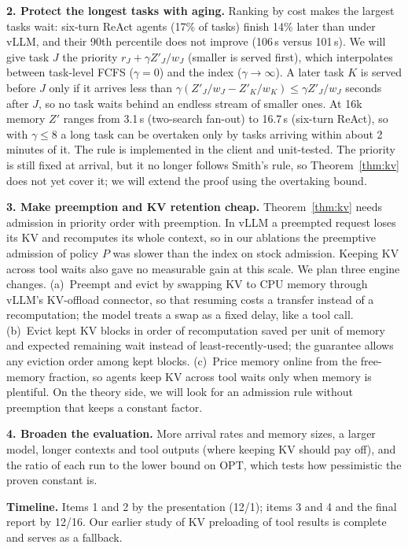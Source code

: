 \documentclass{article}
\newcommand{\OPT}{\mathrm{OPT}}
\begin{document}
\textbf{2. Protect the longest tasks with aging.} Ranking by cost makes the largest tasks wait: six-turn ReAct
agents (17\% of tasks) finish 14\% later than under vLLM, and their 90th percentile does not improve (106\,s versus
101\,s). We will give task $J$ the priority $r_J + \gamma Z'_J/w_J$ (smaller is served first), which interpolates
between task-level FCFS ($\gamma = 0$) and the index ($\gamma \to \infty$). A later task $K$ is served before $J$
only if it arrives less than $\gamma(Z'_J/w_J - Z'_K/w_K) \le \gamma Z'_J/w_J$ seconds after $J$, so no task waits
behind an endless stream of smaller ones. At 16k memory $Z'$ ranges from 3.1\,s (two-search fan-out) to 16.7\,s
(six-turn ReAct), so with $\gamma \le 8$ a long task can be overtaken only by tasks arriving within about 2 minutes
of it. The rule is implemented in the client and unit-tested. The priority is still fixed at arrival, but it no
longer follows Smith's rule, so Theorem~\ref{thm:kv} does not yet cover it; we will extend the proof using the
overtaking bound.

\textbf{3. Make preemption and KV retention cheap.} Theorem~\ref{thm:kv} needs admission in priority order with
preemption. In vLLM a preempted request loses its KV and recomputes its whole context, so in our ablations the
preemptive admission of policy $P$ was slower than the index on stock admission. Keeping KV across tool waits also
gave no measurable gain at this scale. We plan three engine changes. (a)~Preempt and evict by swapping KV to CPU
memory through vLLM's KV-offload connector, so that resuming costs a transfer instead of a recomputation; the
model treats a swap as a fixed delay, like a tool call. (b)~Evict kept KV blocks in order of recomputation saved
per unit of memory and expected remaining wait instead of least-recently-used; the guarantee allows any eviction
order among kept blocks. (c)~Price memory online from the free-memory fraction, so agents keep KV across tool waits
only when memory is plentiful. On the theory side, we will look for an admission rule without preemption that keeps
a constant factor.

\textbf{4. Broaden the evaluation.} More arrival rates and memory sizes, a larger model, longer contexts and tool
outputs (where keeping KV should pay off), and the ratio of each run to the lower bound on $\OPT$, which tests how
pessimistic the proven constant is.

\textbf{Timeline.} Items 1 and 2 by the presentation (12/1); items 3 and 4 and the final report by 12/16. Our
earlier study of KV preloading of tool results is complete and serves as a fallback.
\end{document}
